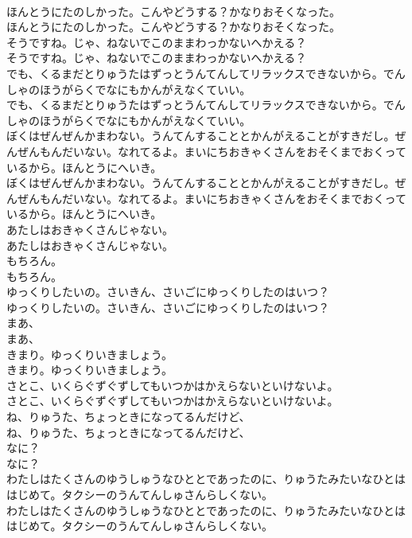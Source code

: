 \documentclass[8pt]{extreport}
\begin{document}
\begin{CJK}{UTF8}{min}
\\	ほんとうにたのしかった。こんやどうする？かなりおそくなった。
\\	ほんとうにたのしかった。こんやどうする？かなりおそくなった。
\\	そうですね。じゃ、ねないでこのままわっかないへかえる？
\\	そうですね。じゃ、ねないでこのままわっかないへかえる？
\\	でも、くるまだとりゅうたはずっとうんてんしてリラックスできないから。でんしゃのほうがらくでなにもかんがえなくていい。
\\	でも、くるまだとりゅうたはずっとうんてんしてリラックスできないから。でんしゃのほうがらくでなにもかんがえなくていい。
\\	ぼくはぜんぜんかまわない。うんてんすることとかんがえることがすきだし。ぜんぜんもんだいない。なれてるよ。まいにちおきゃくさんをおそくまでおくっているから。ほんとうにへいき。
\\	ぼくはぜんぜんかまわない。うんてんすることとかんがえることがすきだし。ぜんぜんもんだいない。なれてるよ。まいにちおきゃくさんをおそくまでおくっているから。ほんとうにへいき。
\\	あたしはおきゃくさんじゃない。
\\	あたしはおきゃくさんじゃない。
\\	もちろん。
\\	もちろん。
\\	ゆっくりしたいの。さいきん、さいごにゆっくりしたのはいつ？
\\	ゆっくりしたいの。さいきん、さいごにゆっくりしたのはいつ？
\\	まあ、
\\	まあ、
\\	きまり。ゆっくりいきましょう。
\\	きまり。ゆっくりいきましょう。
\\	さとこ、いくらぐずぐずしてもいつかはかえらないといけないよ。
\\	さとこ、いくらぐずぐずしてもいつかはかえらないといけないよ。
\\	ね、りゅうた、ちょっときになってるんだけど、
\\	ね、りゅうた、ちょっときになってるんだけど、
\\	なに？
\\	なに？
\\	わたしはたくさんのゆうしゅうなひととであったのに、りゅうたみたいなひとははじめて。タクシーのうんてんしゅさんらしくない。
\\	わたしはたくさんのゆうしゅうなひととであったのに、りゅうたみたいなひとははじめて。タクシーのうんてんしゅさんらしくない。

\end{CJK}
\end{document}

